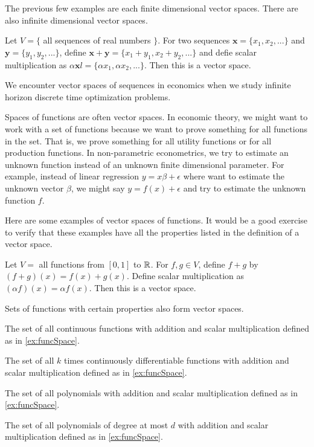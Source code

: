 The previous few examples are each finite dimensional vector
spaces. There are also infinite dimensional vector spaces.
\begin{example}
  Let $V = \{$ all sequences of real numbers $\}$. For two sequences
  $\mathbf{x} = \{x_1, x_2, ... \}$ and $\mathbf{y} = \{y_1, y_2,
  ... \}$, define $\mathbf{x} + \mathbf{y} = \{ x_1 + y_1 , x_2 + y_2,
  ... \}$ and defie scalar multiplication as $\alpha \mathbf{x}l = \{
  \alpha x_1 , \alpha x_2, ... \}$. Then this is a vector space.
\end{example}
We encounter vector spaces of sequences in economics when we study
infinite horizon discrete time optimization problems. 

Spaces of functions are often vector spaces. In economic
theory, we might want to work with a set of functions because we want
to prove something for all functions in the set. That is, we prove
something for all utility functions or for all production
functions. In non-parametric econometrics, we try to estimate an
unknown function instead of an unknown finite dimensional
parameter. For example, instead of linear regression $y = x\beta +
\epsilon$ where want to estimate the unknown vector $\beta$, we might
say $y = f(x) + \epsilon$ and try to estimate the unknown function
$f$. 

Here are some examples of vector spaces of functions. It would be a good
exercise to verify that these examples have all the properties listed
in the definition of a vector space. 
\begin{example} \label{ex:funcSpace}
  Let $V = $ all functions from $[0,1]$ to $\mathbb{R}$. For $f, g \in V$,
  define $f + g$ by $(f+g)(x) = f(x) + g(x)$. Define scalar
  multiplication as $(\alpha f)(x) = \alpha f(x)$. Then this is a
  vector space. 
\end{example}
Sets of functions with certain properties also form vector spaces. 
\begin{example}
  The set of all continuous functions with addition and scalar
  multiplication defined as in \ref{ex:funcSpace}.
\end{example}
\begin{example}
  The set of all $k$ times continuously differentiable functions with
  addition and scalar multiplication defined as in \ref{ex:funcSpace}.
\end{example}
\begin{example}
  The set of all polynomials with addition and scalar
  multiplication defined as in \ref{ex:funcSpace}.
\end{example}
\begin{example} 
  The set of all polynomials of degree at most $d$ with addition and scalar
  multiplication defined as in \ref{ex:funcSpace}.
\end{example}

